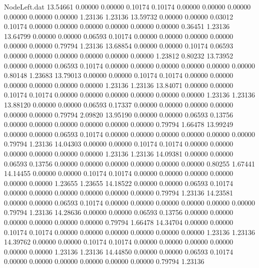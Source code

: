 \begin{filecontents}{NodeLeft.dat}
  13.54661    0.00000    0.00000     0.10174    0.10174    0.00000    0.00000    0.00000    0.00000    0.00000    0.00000    1.23136    1.23136
  13.59732    0.00000    0.00000     0.03012    0.10174    0.00000    0.00000    0.00000    0.00000    0.00000    0.00000    0.36451    1.23136
  13.64799    0.00000    0.00000     0.06593    0.10174    0.00000    0.00000    0.00000    0.00000    0.00000    0.00000    0.79794    1.23136
  13.68854    0.00000    0.00000     0.10174    0.06593    0.00000    0.00000    0.00000    0.00000    0.00000    0.00000    1.23812    0.80232
  13.73952    0.00000    0.00000     0.06593    0.10174    0.00000    0.00000    0.00000    0.00000    0.00000    0.00000    0.80148    1.23683
  13.79013    0.00000    0.00000     0.10174    0.10174    0.00000    0.00000    0.00000    0.00000    0.00000    0.00000    1.23136    1.23136
  13.84071    0.00000    0.00000     0.10174    0.10174    0.00000    0.00000    0.00000    0.00000    0.00000    0.00000    1.23136    1.23136
  13.88120    0.00000    0.00000     0.06593    0.17337    0.00000    0.00000    0.00000    0.00000    0.00000    0.00000    0.79794    2.09820
  13.95190    0.00000    0.00000     0.06593    0.13756    0.00000    0.00000    0.00000    0.00000    0.00000    0.00000    0.79794    1.66478
  13.99249    0.00000    0.00000     0.06593    0.10174    0.00000    0.00000    0.00000    0.00000    0.00000    0.00000    0.79794    1.23136
  14.04303    0.00000    0.00000     0.10174    0.10174    0.00000    0.00000    0.00000    0.00000    0.00000    0.00000    1.23136    1.23136
  14.09381    0.00000    0.00000     0.06593    0.13756    0.00000    0.00000    0.00000    0.00000    0.00000    0.00000    0.80255    1.67441
  14.14455    0.00000    0.00000     0.10174    0.10174    0.00000    0.00000    0.00000    0.00000    0.00000    0.00000    1.23655    1.23655
  14.18522    0.00000    0.00000     0.06593    0.10174    0.00000    0.00000    0.00000    0.00000    0.00000    0.00000    0.79794    1.23136
  14.23581    0.00000    0.00000     0.06593    0.10174    0.00000    0.00000    0.00000    0.00000    0.00000    0.00000    0.79794    1.23136
  14.28636    0.00000    0.00000     0.06593    0.13756    0.00000    0.00000    0.00000    0.00000    0.00000    0.00000    0.79794    1.66478
  14.34704    0.00000    0.00000     0.10174    0.10174    0.00000    0.00000    0.00000    0.00000    0.00000    0.00000    1.23136    1.23136
  14.39762    0.00000    0.00000     0.10174    0.10174    0.00000    0.00000    0.00000    0.00000    0.00000    0.00000    1.23136    1.23136
  14.44850    0.00000    0.00000     0.06593    0.10174    0.00000    0.00000    0.00000    0.00000    0.00000    0.00000    0.79794    1.23136

\end{filecontents}
